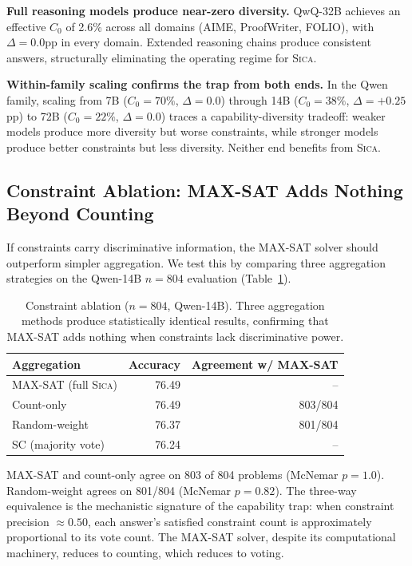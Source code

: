 \documentclass[11pt,a4paper]{article}
\newcommand{\sica}{\textsc{Sica}}
\begin{document}
\textbf{Full reasoning models produce near-zero diversity.}
QwQ-32B achieves an effective $C_0$ of 2.6\% across all domains (AIME, ProofWriter, FOLIO), with $\Delta=0.0$pp in every domain.
Extended reasoning chains produce consistent answers, structurally eliminating the operating regime for \sica{}.

\textbf{Within-family scaling confirms the trap from both ends.}
In the Qwen family, scaling from 7B ($C_0=70\%$, $\Delta=0.0$) through 14B ($C_0=38\%$, $\Delta=+0.25$pp) to 72B ($C_0=22\%$, $\Delta=0.0$) traces a capability-diversity tradeoff: weaker models produce more diversity but worse constraints, while stronger models produce better constraints but less diversity.
Neither end benefits from \sica{}.

\subsection{Constraint Ablation: MAX-SAT Adds Nothing Beyond Counting}
\label{sec:ablation}

If constraints carry discriminative information, the MAX-SAT solver should outperform simpler aggregation.
We test this by comparing three aggregation strategies on the Qwen-14B $n=804$ evaluation (Table~\ref{tab:ablation}).

\begin{table}[t]
\centering
\caption{Constraint ablation ($n=804$, Qwen-14B). Three aggregation methods produce statistically identical results, confirming that MAX-SAT adds nothing when constraints lack discriminative power.}
\label{tab:ablation}
\small
\begin{tabular}{lrr}
\toprule
\textbf{Aggregation} & \textbf{Accuracy} & \textbf{Agreement w/ MAX-SAT} \\
\midrule
MAX-SAT (full \sica{}) & 76.49 & -- \\
Count-only & 76.49 & 803/804 \\
Random-weight & 76.37 & 801/804 \\
SC (majority vote) & 76.24 & -- \\
\bottomrule
\end{tabular}
\end{table}

MAX-SAT and count-only agree on 803 of 804 problems (McNemar $p=1.0$).
Random-weight agrees on 801/804 (McNemar $p=0.82$).
The three-way equivalence is the mechanistic signature of the capability trap: when constraint precision $\approx 0.50$, each answer's satisfied constraint count is approximately proportional to its vote count.
The MAX-SAT solver, despite its computational machinery, reduces to counting, which reduces to voting.
\end{document}
